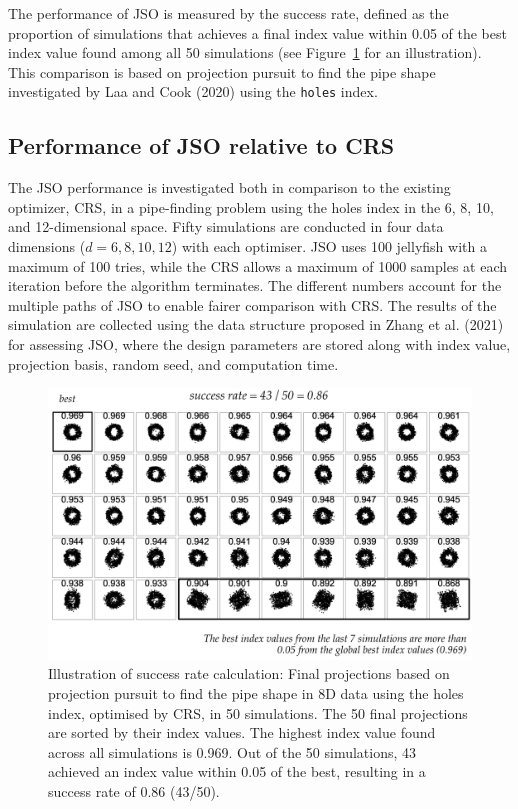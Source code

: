 \documentclass[
  12pt,
]{interact}
\theoremstyle{plain}
\begin{document}
The performance of JSO is measured by the success rate, defined as the
proportion of simulations that achieves a final index value within 0.05
of the best index value found among all 50 simulations (see
Figure~\ref{fig-success-rate} for an illustration). This comparison is
based on projection pursuit to find the pipe shape investigated by Laa
and Cook (2020) using the \texttt{holes} index.

\hypertarget{sec-app-1}{%
\subsection{Performance of JSO relative to CRS}\label{sec-app-1}}

The JSO performance is investigated both in comparison to the existing
optimizer, CRS, in a pipe-finding problem using the holes index in the
6, 8, 10, and 12-dimensional space. Fifty simulations are conducted in
four data dimensions (\(d = 6, 8, 10, 12\)) with each optimiser. JSO
uses 100 jellyfish with a maximum of 100 tries, while the CRS allows a
maximum of 1000 samples at each iteration before the algorithm
terminates. The different numbers account for the multiple paths of JSO
to enable fairer comparison with CRS. The results of the simulation are
collected using the data structure proposed in Zhang et al. (2021) for
assessing JSO, where the design parameters are stored along with index
value, projection basis, random seed, and computation time.

\begin{figure}

{\centering \includegraphics[width=4.52in,height=\textheight]{figures/success-rate.png}

}

\caption{\label{fig-success-rate}Illustration of success rate
calculation: Final projections based on projection pursuit to find the
pipe shape in 8D data using the holes index, optimised by CRS, in 50
simulations. The 50 final projections are sorted by their index values.
The highest index value found across all simulations is 0.969. Out of
the 50 simulations, 43 achieved an index value within 0.05 of the best,
resulting in a success rate of 0.86 (43/50).}

\end{figure}
\end{document}
